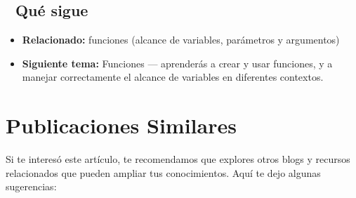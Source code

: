 \documentclass[
  doc,
  floatsintext,
  longtable,
  a4paper,
  nolmodern,
  notxfonts,
  notimes,
  12pt,
  colorlinks=true,linkcolor=blue,citecolor=blue,urlcolor=blue]{apa7}
\providecommand{\tightlist}{%
  \setlength{\itemsep}{0pt}\setlength{\parskip}{0pt}}
\begin{document}
\subsection{🔗 Qué sigue}\label{quuxe9-sigue}

\begin{itemize}
\tightlist
\item
  \textbf{Relacionado:} funciones (alcance de variables, parámetros y
  argumentos)
\item
  \textbf{Siguiente tema:} Funciones --- aprenderás a crear y usar
  funciones, y a manejar correctamente el alcance de variables en
  diferentes contextos.
\end{itemize}

\section{Publicaciones Similares}\label{publicaciones-similares}

Si te interesó este artículo, te recomendamos que explores otros blogs y
recursos relacionados que pueden ampliar tus conocimientos. Aquí te dejo
algunas sugerencias:
\end{document}
